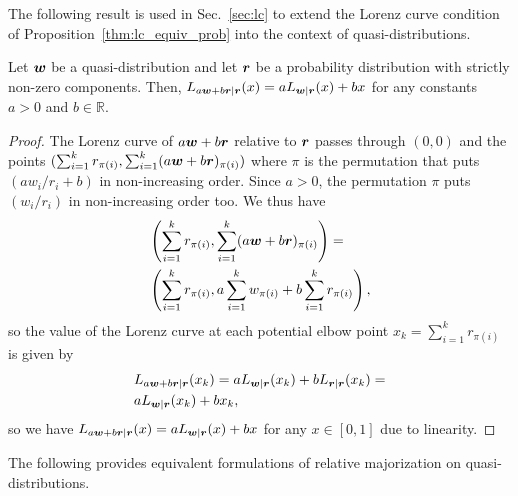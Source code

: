 \documentclass[pra,
aps,
twocolumn,
superscriptaddress,
groupedaddress,
nofootinbib,
reprint
]{revtex4-1}
\begin{document}
The following result is used in Sec.~\ref{sec:lc} to extend the Lorenz curve condition of Proposition~\ref{thm:lc_equiv_prob} into the context of quasi-distributions.
\begin{proposition}\label{Lorenz_linearity}
	Let $\boldsymbol{w}$ be a quasi-distribution and let $\boldsymbol{r}$ be a probability distribution with strictly non-zero components. 
	Then, $L_{a\boldsymbol{w} + b \boldsymbol{r} | \boldsymbol{r}} (x) = a L_{\boldsymbol{w} |\boldsymbol{r}}(x) + b x$ for any constants $a > 0$ and $b \in \mathbb{R}$.
\end{proposition}
\begin{proof} 
	The Lorenz curve of $a\boldsymbol{w} + b \boldsymbol{r}$ relative to $\boldsymbol{r}$ passes through $(0,0)$ and the points $(\sum_{i=1}^k{r_{\pi(i)}}, \sum_{i=1}^k(a \boldsymbol{w} + b \boldsymbol{r})_{\pi(i)})$ where $\pi$ is the permutation that puts $(a w_i/r_i + b)$ in non-increasing order. Since $a > 0$, the permutation $\pi$ puts  $(w_i/r_i)$ in non-increasing order too. We thus have
\begin{align*}
&\left( \sum_{i=1}^k r_{\pi(i)}, \sum_{i=1}^k(a \boldsymbol{w} + b \boldsymbol{r})_{\pi(i)} \right) = \\ 
&\left( \sum_{i=1}^k r_{\pi(i)},a \sum_{i=1}^k  w_{\pi(i)} + b\sum_{i=1}^k r_{\pi(i)} \right) \nonumber,
\end{align*}
so the value of the Lorenz curve at each potential elbow point $x_k = \sum_{i=1} ^kr_{\pi(i)}$ is given by
\begin{align}
&L_{a \boldsymbol{w} +b \boldsymbol{r}|\boldsymbol{r}} (x_k) = a L_{\boldsymbol{w}|\boldsymbol{r}} (x_k) + b L_{\boldsymbol{r}|\boldsymbol{r}}(x_k) = \nonumber\\
&a L_{\boldsymbol{w}|\boldsymbol{r}} (x_k) + b x_k,
\end{align}
so we have $L_{a\boldsymbol{w}  + b\boldsymbol{r}|\boldsymbol{r}} (x) = a L_{\boldsymbol{w} |\boldsymbol{r}}(x) + b x$ for any $x \in [0,1]$ due to linearity.
\end{proof}
	
The following provides equivalent formulations of relative majorization on quasi-distributions. 
\end{document}
